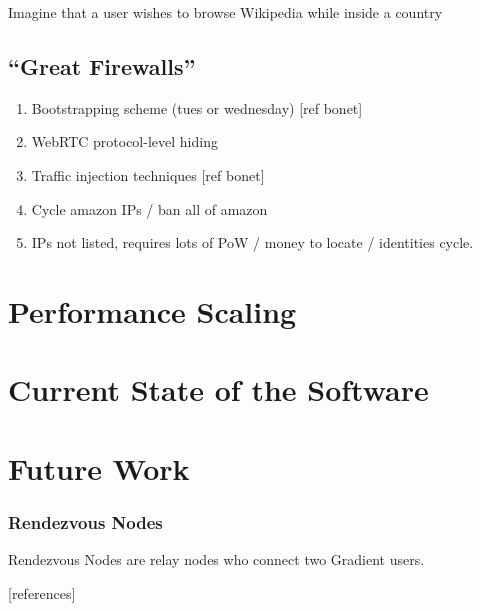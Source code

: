 \documentclass{article}
\begin{document}
Imagine that a user wishes to browse Wikipedia while inside a country

\subsection{“Great Firewalls”}

\begin{enumerate}
    \item Bootstrapping scheme (tues or wednesday) [ref bonet] 
    \item WebRTC protocol-level hiding
    \item Traffic injection techniques [ref bonet]
    \item Cycle amazon IPs / ban all of amazon
    \item IPs not listed, requires lots of PoW / money to locate / identities cycle.
\end{enumerate}

\section{Performance Scaling}

\section{Current State of the Software}

\section{Future Work}

\subsubsection{Rendezvous Nodes}

\begin{figure}[htbp]
  \centering
  
  \caption{}
\end{figure}

Rendezvous Nodes are relay nodes who connect two Gradient users.

[references]
\end{document}
